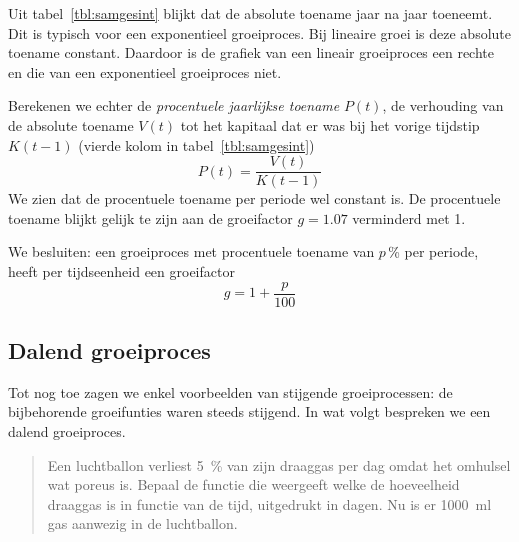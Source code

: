 Uit tabel~\ref{tbl:samgesint}  blijkt dat de absolute toename jaar na jaar toeneemt. Dit is typisch voor een exponentieel groeiproces. 
 Bij lineaire groei is deze absolute toename constant. Daardoor is de grafiek van een lineair groeiproces een rechte en die van een exponentieel groeiproces niet.
 
 Berekenen we echter de
 \emph{procentuele jaarlijkse toename} $P(t)$,  de verhouding van de
 absolute toename $V(t)$ tot het kapitaal dat er was bij het vorige tijdstip $K(t-1)$ (vierde kolom in tabel~\ref{tbl:samgesint})
 \begin{displaymath}
     P(t)=\frac{V(t)}{K(t-1)}
 \end{displaymath}
We zien dat de procentuele toename per periode wel
constant is. De procentuele toename blijkt gelijk te zijn aan de groeifactor $g=\num{1.07}$ verminderd met 1.

We besluiten: een groeiproces met procentuele toename van $p$\,\%
 per periode, heeft per
 tijdseenheid een groeifactor 
 \begin{equation}
 g=1+\frac{p}{100}
 \label{eq:groeifactor_procent}
 \end{equation}

 \subsection{Dalend groeiproces}\label{subsec.ballon}
 Tot nog toe zagen we enkel voorbeelden van stijgende groeiprocessen: de bijbehorende groeifunties waren steeds stijgend. In wat volgt bespreken we een dalend groeiproces.
 \begin{quote}
     Een luchtballon verliest  \SI{5}{\percent} van zijn
 draaggas per dag omdat het omhulsel wat poreus is. Bepaal de functie die weergeeft welke de hoeveelheid draaggas is in functie van de tijd, uitgedrukt in dagen. Nu is er \SI{1000}{\milli\litre} gas aanwezig in de luchtballon.
  \end{quote}


